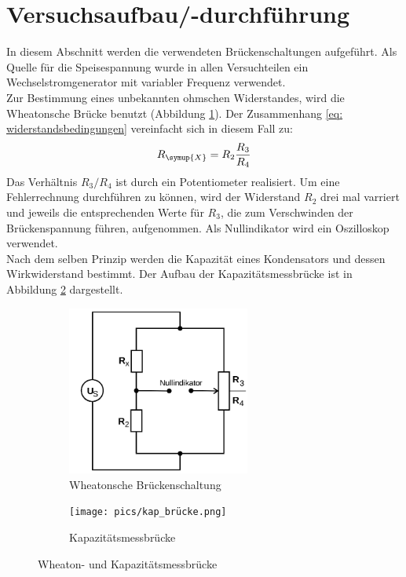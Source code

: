 \section{Versuchsaufbau/-durchführung}\label{abs: aufbau}
In diesem Abschnitt werden die verwendeten Brückenschaltungen aufgeführt. Als Quelle für
die Speisespannung wurde in allen Versuchteilen ein Wechselstromgenerator mit variabler Frequenz
verwendet. \\
Zur Bestimmung eines unbekannten ohmschen Widerstandes, wird die Wheatonsche Brücke
benutzt (Abbildung \ref{fig: wheaton}).
Der Zusammenhang \eqref{eq: widerstandsbedingungen} vereinfacht sich in diesem Fall zu:
\begin{equation}
  R_{\symup{X}} = R_2 \frac{R_3}{R_4}
\end{equation}
Das Verhältnis $R_3 / R_4$ ist durch ein Potentiometer realisiert. Um eine Fehlerrechnung durchführen
zu können, wird der Widerstand $R_2$ drei mal varriert und jeweils die entsprechenden Werte für $R_3$, die
zum Verschwinden der Brückenspannung führen, aufgenommen. Als Nullindikator wird ein Oszilloskop verwendet. \\
Nach dem selben Prinzip werden die Kapazität eines Kondensators und dessen Wirkwiderstand bestimmt. Der Aufbau
der Kapazitätsmessbrücke ist in Abbildung \ref{fig: kapazität} dargestellt.

\begin{figure}
\centering
\begin{subfigure}{0.49\textwidth}
  \centering
  \includegraphics[width = 6cm]{pics/wheaton.png}
  \caption{Wheatonsche Brückenschaltung}
  \label{fig: wheaton}
\end{subfigure}
\begin{subfigure}{0.49\textwidth}
\centering
\texttt{[image: pics/kap\_brücke.png]}
\caption{Kapazitätsmessbrücke}
\label{fig: kapazität}
\end{subfigure}
\caption{Wheaton- und Kapazitätsmessbrücke \cite{anleitung302}}
\label{fig: kapind}
\end{figure}


